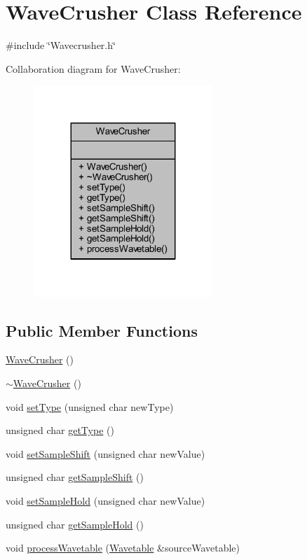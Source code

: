 \hypertarget{class_wave_crusher}{}\section{Wave\+Crusher Class Reference}
\label{class_wave_crusher}


{\ttfamily \#include \char`\"{}Wavecrusher.\+h\char`\"{}}



Collaboration diagram for Wave\+Crusher\+:
\nopagebreak
\begin{figure}[H]
\begin{center}
\leavevmode
\includegraphics[width=191pt]{db/d06/class_wave_crusher__coll__graph}
\end{center}
\end{figure}
\subsection*{Public Member Functions}
\begin{DoxyCompactItemize}
\item 
\hyperlink{class_wave_crusher_a3e0ce1e58ad9fe4ab8a18fb6ecdb0db2}{Wave\+Crusher} ()
\item 
\hyperlink{class_wave_crusher_a464c498c7a7219aa92ba30b3951dc282}{$\sim$\+Wave\+Crusher} ()
\item 
void \hyperlink{class_wave_crusher_a61ba1c5b0cf0c3bd1f112de317f2deb3}{set\+Type} (unsigned char new\+Type)
\item 
unsigned char \hyperlink{class_wave_crusher_a2bb40dc158e5e3358b632572ba2eb7c3}{get\+Type} ()
\item 
void \hyperlink{class_wave_crusher_a94b87729fc0b2930b98e8c5fb9ed2631}{set\+Sample\+Shift} (unsigned char new\+Value)
\item 
unsigned char \hyperlink{class_wave_crusher_a08b705c5bb1c1c4a22d8265f2992a0bd}{get\+Sample\+Shift} ()
\item 
void \hyperlink{class_wave_crusher_aa3df1e5da9635cf84a59e4d481bf208b}{set\+Sample\+Hold} (unsigned char new\+Value)
\item 
unsigned char \hyperlink{class_wave_crusher_a084b8413b14c16e4cab7f65caf9e3fd0}{get\+Sample\+Hold} ()
\item 
void \hyperlink{class_wave_crusher_a906f0056db9847e6fafd406ab9e613a9}{process\+Wavetable} (\hyperlink{class_wavetable}{Wavetable} \&source\+Wavetable)
\end{DoxyCompactItemize}


